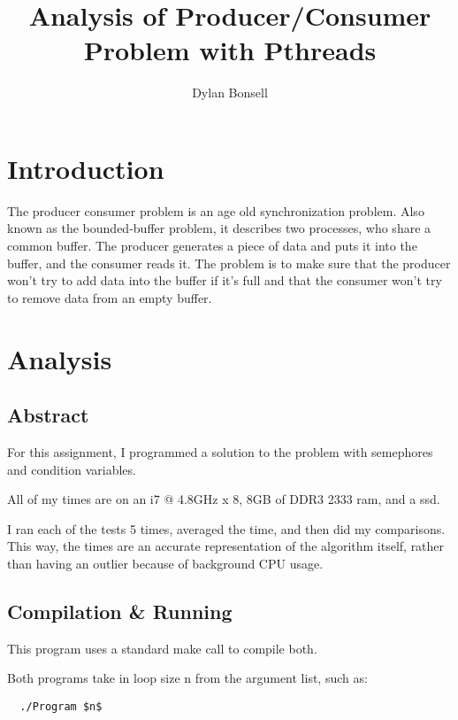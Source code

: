 \documentclass[dvips]{article}
\begin{document}
\title{Analysis of Producer/Consumer Problem with Pthreads}
 
\author{Dylan Bonsell}
 
\maketitle %
 
\section{Introduction}

The producer consumer problem is an age old synchronization problem. Also known as the bounded-buffer problem, it describes two processes, who share a common buffer. The producer generates a piece of data and puts it into the buffer, and the consumer reads it. The problem is to make sure that the producer won't try to add data into the buffer if it's full and that the consumer won't try to remove data from an empty buffer.

\section{Analysis}
 
\subsection{Abstract}

For this assignment, I programmed a solution to the problem with semephores and condition variables.

All of my times are on an i7 @ 4.8GHz x 8, 8GB of DDR3 2333 ram, and a ssd.

I ran each of the tests 5 times, averaged the time, and then did my comparisons. This way, the times are an accurate representation of the algorithm itself,
rather than having an outlier because of background CPU usage. 

\subsection{Compilation \& Running}
 This program uses a standard make call to compile both.

 Both programs take in loop size n from the argument list, such as:
 \begin{verbatim}
  ./Program $n$
 \end{verbatim}
\end{document}

